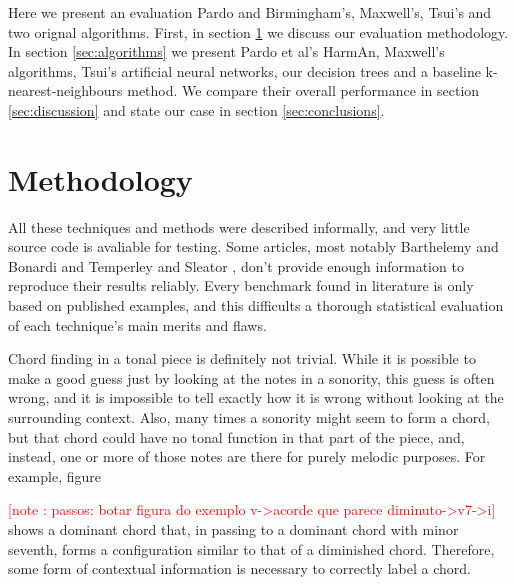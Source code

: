 \documentclass{article}
\newcounter{notecounter}
\newcommand{\note}[1]{
  \addtocounter{notecounter}{1}
  \textcolor{red}{[note \arabic{notecounter}: #1]}
}
\newcommand{\comment}[1]{}
\begin{document}
Here we present an evaluation Pardo and Birmingham's, Maxwell's,
Tsui's and two orignal algorithms. First, in section
\ref{sec:methodology} we discuss our evaluation methodology. In
section \ref{sec:algorithms} we present Pardo et al's HarmAn,
Maxwell's algorithms, Tsui's artificial neural networks, our decision
trees and a baseline k-nearest-neighbours method. We compare their
overall performance in section \ref{sec:discussion} and state our case
in section \ref{sec:conclusions}.

\section{Methodology}
\label{sec:methodology}

\comment{
  ==> um problema de information retrieval
  ==> precision, recall (e significado)
  ==> corais de bach
}

All these techniques and methods were described informally, and very
little source code is avaliable for testing. Some articles, most
notably Barthelemy and Bonardi \cite{barthelemy.ea:figured} and
Temperley and Sleator \cite{temperley.ea:modeling}, don't provide
enough information to reproduce their results reliably. Every
benchmark found in literature \cite{pardo.ea:automated,
  barthelemy.ea:figured, tsui:harmonic, taube:automatic,
  illescas.ea:harmonic} is only based on published examples, and this
difficults a thorough statistical evaluation of each technique's main
merits and flaws.

Chord finding in a tonal piece is definitely not trivial. While it is
possible to make a good guess just by looking at the notes in a
sonority, this guess is often wrong, and it is impossible to tell
exactly how it is wrong without looking at the surrounding
context. Also, many times a sonority might seem to form a chord, but
that chord could have no tonal function in that part of the piece,
and, instead, one or more of those notes are there for purely melodic
purposes. For example, figure \note{passos: botar figura do exemplo
  v->acorde que parece diminuto->v7->i} shows a dominant chord that,
in passing to a dominant chord with minor seventh, forms a
configuration similar to that of a diminished chord. Therefore, some
form of contextual information is necessary to correctly label a
chord.
\end{document}
